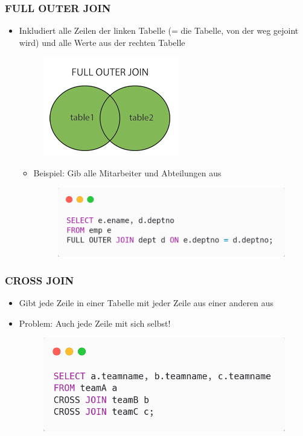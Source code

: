 \subsubsection{FULL OUTER JOIN}
\begin{itemize}
    \item Inkludiert alle Zeilen der linken Tabelle (= die Tabelle, von der weg gejoint wird) und alle Werte aus der rechten Tabelle
    \begin{figure}[H]
        \centering
        \includegraphics{res/themekorb_2/joins_full_outer_join.png} 
    \end{figure}
    \begin{itemize}
        \item Beispiel: Gib alle Mitarbeiter und Abteilungen aus
        \begin{figure}[H]
            \centering 
            \includegraphics[scale=.45]{res/themekorb_2/joins_full_outer_join_example.png}
        \end{figure}
    \end{itemize}
\end{itemize}

\subsubsection{CROSS JOIN}
\begin{itemize}
    \item Gibt jede Zeile in einer Tabelle mit jeder Zeile aus einer anderen aus
    \item Problem: Auch jede Zeile mit sich selbst!
    \begin{figure}[H]
        \centering
        \includegraphics[scale=.4]{res/themekorb_2/cross_join.png} 
    \end{figure}
\end{itemize}

